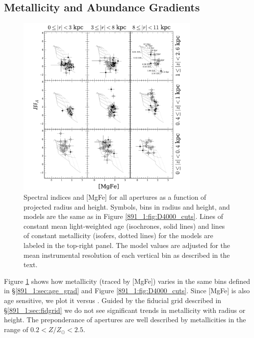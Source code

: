 \subsection{Metallicity and Abundance Gradients}
\label{891_1:sec:metal_a}
\begin{figure}
  \centering
  \includegraphics[width=0.8\textwidth]{891_1/figs/MgFe_multires.pdf}
  \caption[{[MgFe] vs \Hda in radius and height
    bins}]{\label{891_1:fig:MgFe_cuts}\fixspacing Spectral indices \Hda and
    [MgFe] for all apertures as a function of projected radius and
    height. Symbols, bins in radius and height, and models are the
    same as in Figure \ref{891_1:fig:D4000_cuts}. Lines of constant mean
    light-weighted age (isochrones, solid lines) and lines of constant
    metallicity (isofers, dotted lines) for the models are labeled in
    the top-right panel. The model values are adjusted for the mean
    instrumental resolution of each vertical bin as described in the
    text.}
\end{figure}

Figure \ref{891_1:fig:MgFe_cuts} shows how metallicity (traced by [MgFe])
varies in the same bins defined in \S\ref{891_1:sec:age_grad} and Figure
\ref{891_1:fig:D4000_cuts}. Since [MgFe] is also age sensitive, we plot it
versus \Hda.  Guided by the fiducial grid described in
\S\ref{891_1:sec:fidgrid} we do not see significant trends in metallicity
with radius or height. The preponderance of apertures are well
described by metallicities in the range of $0.2 < Z/Z_\odot < 2.5$.

